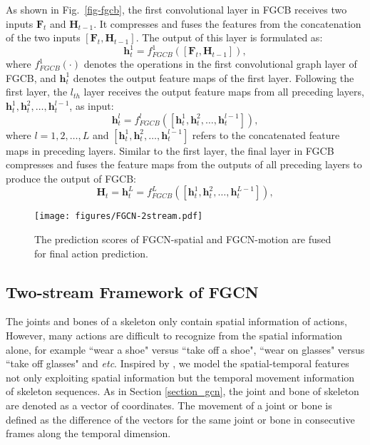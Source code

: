 \documentclass[runningheads]{llncs}
\begin{document}
As shown in Fig.~\ref{fig-fgcb}, the first convolutional layer in FGCB receives two inputs $\textbf{F}_t$ and $\textbf{H}_{t-1}$. It compresses and fuses the features from the concatenation of the two inputs $[\textbf{F}_t,\textbf{H}_{t-1}]$. The output of this layer is formulated as:
\begin{equation}
\textbf{h}_t^1 = f_{FGCB}^1([\textbf{F}_t,\textbf{H}_{t-1}]),
\end{equation}
where $f_{FGCB}^1(\cdot)$ denotes the operations in the first convolutional graph layer of FGCB, and $\textbf{h}_t^1$ denotes the output feature maps of the first layer. Following the first layer, the $l_{th}$ layer receives the output feature maps from all preceding layers, $\textbf{h}_t^1, \textbf{h}_t^2,\dots,\textbf{h}_t^{l-1}$, as input:
\begin{equation}
\textbf{h}_t^l=f_{FGCB}^l([\textbf{h}_t^1, \textbf{h}_t^2,\dots,\textbf{h}_t^{l-1}]),
\end{equation}
where $l=1,2,\dots,L$ and $ [\textbf{h}_t^1, \textbf{h}_t^2,\dots,\textbf{h}_t^{l-1}]$ refers to the concatenated feature maps in preceding layers. Similar to the first layer, the final layer in FGCB compresses and fuses the feature maps from the outputs of all preceding layers to produce the output of FGCB:
\begin{equation}
\textbf{H}_t=\textbf{h}_t^L=f_{FGCB}^L([\textbf{h}_t^1, \textbf{h}_t^2,\dots,\textbf{h}_t^{L-1}]),
\end{equation}
\vspace{-6mm}

\begin{figure}[t]
	\centering
	\texttt{[image: figures/FGCN-2stream.pdf]}
	\caption{The prediction scores of FGCN-spatial and FGCN-motion are fused for final action prediction.}
	\vspace{-4mm}
	\label{fig-2stream}
\end{figure}

\subsection{Two-stream Framework of FGCN}
The joints and bones of a skeleton only contain spatial information of actions, However, many actions are difficult to recognize from the spatial information alone, for example ``wear a shoe" versus ``take off a shoe", ``wear on glasses" versus ``take off glasses" and \textit{etc}. Inspired by \cite{shi2019skeleton}, we model the spatial-temporal features not only exploiting spatial information but the temporal movement information of skeleton sequences. As in Section \ref{section_gcn}, the joint and bone of skeleton are denoted as a vector of coordinates. The movement of a joint or bone is defined as the difference of the vectors for the same joint or bone in consecutive frames along the temporal dimension.
\end{document}
